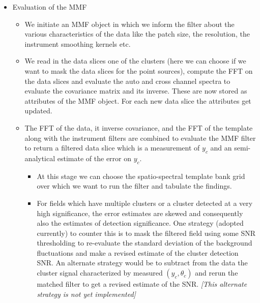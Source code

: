 \documentclass[11pt]{article}
\begin{document}
\begin{itemize}
\item {Evaluation of the MMF}
\begin{itemize}
	\item We initiate an MMF object in which we inform the filter about the various characteristics of the data like the patch size, the resolution, the instrument smoothing kernels etc. 
	\item We read in the data slices one of the clusters (here we can choose if we want to mask the data slices for the point sources), compute the FFT on the data slices and evaluate the auto and cross channel spectra to evaluate the covariance matrix and its inverse. These are now stored as attributes of the MMF object. For each new data slice the attributes get updated.
	\item The FFT of the data, it inverse covariance, and the FFT of the template along with the instrument filters are combined to evaluate the MMF filter to return a filtered data slice which is a measurement of $y_c$ and an semi-analytical estimate of the error on $y_c$.
	\begin{itemize}
		\item At this stage we can choose the spatio-spectral template bank grid over which we want to run the filter and tabulate the findings.
		\item For fields which have multiple clusters or a cluster detected at a very high significance, the error estimates are skewed and consequently also the estimates of detection significance. One strategy (adopted currently) to counter this is to mask the filtered field using some SNR thresholding to re-evaluate the standard deviation of the background fluctuations and make a revised estimate of the cluster detection SNR. An alternate strategy would be to subtract from the data the cluster signal characterized by measured $(y_c,\theta_c)$ and rerun the matched filter to get a revised estimate of the SNR. \textit{[This alternate strategy is not yet implemented]}
	\end{itemize}
\end{itemize}
\end{itemize}
\end{document}
